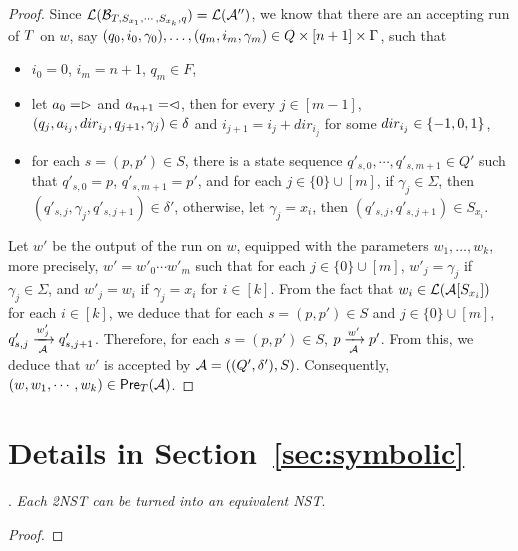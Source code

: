 \begin{proof}
Since $\mathcal{L}(\mathcal{B}_{T, S_{x_1}, \cdots, S_{x_k}, q})=\mathcal{L}(\mathcal{A}'')$, we know that  there are an accepting run of $T$ on $w$, 
say $(q_0, i_0, \gamma_0),\ldots, (q_m, i_m, \gamma_m) \in Q \times [n+1] \times \Gamma$, such that 
\begin{itemize}
\item $i_0=0$, $i_m = n+1$, $q_m \in F$, 
%
\item let $a_0 = \vartriangleright$ and $a_{n+1} = \vartriangleleft$,  then for every $j \in [m-1]$, $(q_j, a_{i_j}, dir_{i_j}, q_{j+1}, \gamma_j) \in
        \delta$ and $i_{j+1} = i_j + dir_{i_j}$ for some $dir_{i_j} \in \{-1, 0, 1\}$, 
 \item  for each $s=(p, p') \in S$, there is a state sequence $q'_{s, 0}, \cdots, q'_{s,m+1} \in Q'$ such that $q'_{s,0}= p$, $q'_{s, m+1} = p'$, and 
 for each $j \in \{0\} \cup [m]$, if $\gamma_j \in \Sigma$, then $(q'_{s, j}, \gamma_j, q'_{s, j+1}) \in \delta'$, otherwise, let $\gamma_j =x_i$, then $(q'_{s, j}, q'_{s, j+1}) \in S_{x_i}$.  
\end{itemize}
Let $w'$ be the output of the run on $w$, equipped with the parameters $w_1,\ldots, w_k$, more precisely, $w' = w'_0 \cdots w'_m$ such that for each $j \in \{0\} \cup [m]$, $w'_j = \gamma_j$ if $\gamma_j \in \Sigma$, and $w'_j = w_i$ if $\gamma_j = x_i$ for $i \in [k]$. From the fact that $w_i \in \mathcal{L}(\mathcal{A}[S_{x_i}])$ for each $i \in [k]$, we deduce that for each $s = (p,p') \in S$ and $j \in \{0\} \cup [m]$, $q'_{s, j} \xrightarrow[\mathcal{A}]{w'_j} q'_{s, j+1}$.
Therefore, for each $s = (p,p') \in S$, $p \xrightarrow[\mathcal{A}]{w'} p'$. From this, we deduce that $w'$ is accepted by $\mathcal{A}=((Q', \delta'), S)$.
Consequently, $(w, w_1,\cdots, w_k) \in \textsf{Pre}_{T}(\mathcal{A})$.
\end{proof}




\section{Details in Section~\ref{sec:symbolic}}

\smallskip

. \emph{Each 2NST can be turned into an equivalent NST}.

\smallskip

\begin{proof}
\end{proof}
